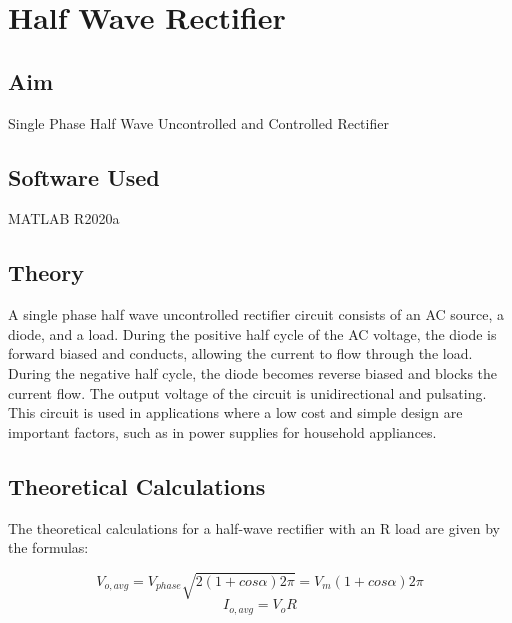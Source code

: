 \chapter{Half Wave Rectifier}
\vspace{-1cm}

\section{Aim}
\hspace{1cm}Single Phase Half Wave Uncontrolled and Controlled Rectifier

\section{Software Used}
\hspace{1cm}MATLAB R2020a
\section{Theory}
\hspace{\parindent}

A single phase half wave uncontrolled rectifier circuit consists of an AC source, a diode, and a load. During the positive half cycle of the AC voltage, the diode is forward biased and conducts, allowing the current to flow through the load. During the negative half cycle, the diode becomes reverse biased and blocks the current flow. The output voltage of the circuit is unidirectional and pulsating. This circuit is used in applications where a low cost and simple design are important factors, such as in power supplies for household appliances.



\section{Theoretical Calculations}
\hspace{\parindent}
The theoretical calculations for a half-wave rectifier with an R load are given by the formulas:


$$
    V_{o,avg} =
    V_{phase}
    \sqrt{2(1 + cos\alpha)2\pi} =
    V_m(1 + cos\alpha)
    2\pi
$$
$$
    I_{o,avg} =
    V_oR
$$

